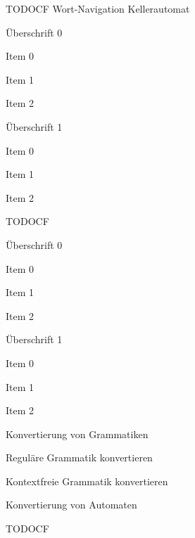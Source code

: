 {
  TODOCF Wort-Navigation Kellerautomat \\
  
      \begin{itemgroup}{Überschrift 0}
	\item Item 0
	\item Item 1
	\item Item 2
	\end{itemgroup}
    
	\begin{itemgroup}{Überschrift 1}
	\item Item 0
	\item Item 1
	\item Item 2
	\end{itemgroup}
}

{
TODOCF \\
    \begin{itemgroup}{Überschrift 0}
	\item Item 0
	\item Item 1
	\item Item 2
	\end{itemgroup}
    
	\begin{itemgroup}{Überschrift 1}
	\item Item 0
	\item Item 1
	\item Item 2
	\end{itemgroup}
}

{
    \begin{itemgroup}{}
	\item Konvertierung von Grammatiken
		\begin{itemgroup}{}
    	\item Reguläre Grammatik konvertieren
    	\item Kontextfreie Grammatik konvertieren
    	\end{itemgroup}
	\item Konvertierung von Automaten
		\begin{itemgroup}{}
    	\item TODOCF
    	\end{itemgroup}
	\end{itemgroup}
  
	\vfill{}
}

